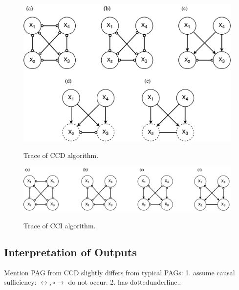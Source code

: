 \documentclass[11pt]{article}
\theoremstyle{definition}
\begin{document}
\begin{figure}[H]
    \centering
        \caption{Trace of CCD algorithm.}
        \includegraphics[scale=.3]{figures/ccdtrace.png}
    \label{fig:3}
\end{figure}

\begin{figure}[H]
    \centering
        \caption{Trace of CCI algorithm.}
        \includegraphics[scale=.3]{figures/ccitrace.png}
    \label{fig:3}
\end{figure}



\subsection{Interpretation of Outputs}

Mention PAG from CCD slightly differs from typical PAGs:
1. assume causal sufficiency: $\leftrightarrow, \circ\rightarrow$ do not occur.
2. has dottedunderline..
\end{document}
